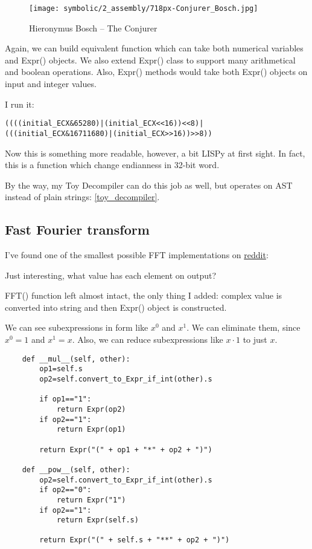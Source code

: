 \begin{figure}[H]
\centering
\texttt{[image: symbolic/2\_assembly/718px-Conjurer\_Bosch.jpg]}
\caption{Hieronymus Bosch -- The Conjurer}
\end{figure}

Again, we can build equivalent function which can take both numerical variables and Expr() objects.
We also extend Expr() class to support many arithmetical and boolean operations.
Also, Expr() methods would take both Expr() objects on input and integer values.



I run it:

\begin{lstlisting}
((((initial_ECX&65280)|(initial_ECX<<16))<<8)|(((initial_ECX&16711680)|(initial_ECX>>16))>>8))
\end{lstlisting}

Now this is something more readable, however, a bit LISPy at first sight.
In fact, this is a function which change endianness in 32-bit word.

By the way, my Toy Decompiler can do this job as well, but operates on \ac{AST} instead
of plain strings: \ref{toy_decompiler}.

\subsection{Fast Fourier transform}

I've found one of the smallest possible FFT implementations on \href{https://www.reddit.com/r/Python/comments/1la4jp/understanding_the_fft_algorithm_with_python/}{reddit}:



Just interesting, what value has each element on output?



FFT() function left almost intact, the only thing I added: complex value is converted into string and then
Expr() object is constructed.



We can see subexpressions in form like $x^0$ and $x^1$.
We can eliminate them, since $x^0=1$ and $x^1=x$.
Also, we can reduce subexpressions like $x \cdot 1$ to just $x$.

\begin{lstlisting}
    def __mul__(self, other):
        op1=self.s
        op2=self.convert_to_Expr_if_int(other).s

        if op1=="1":
            return Expr(op2)
        if op2=="1":
            return Expr(op1)

        return Expr("(" + op1 + "*" + op2 + ")")

    def __pow__(self, other):
        op2=self.convert_to_Expr_if_int(other).s
        if op2=="0":
            return Expr("1")
        if op2=="1":
            return Expr(self.s)

        return Expr("(" + self.s + "**" + op2 + ")")
\end{lstlisting}

